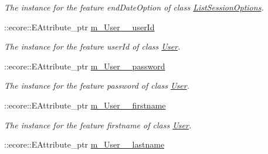 \begin{DoxyCompactItemize}
\begin{DoxyCompactList}\small\item\em The instance for the feature endDateOption of class \hyperlink{classUMS__Data_1_1ListSessionOptions}{ListSessionOptions}. \item\end{DoxyCompactList}\item 
\hypertarget{classUMS__Data_1_1UMS__DataPackage_a7c0066c7f09ef22aa501978b92c16e91}{
::ecore::EAttribute\_\-ptr \hyperlink{classUMS__Data_1_1UMS__DataPackage_a7c0066c7f09ef22aa501978b92c16e91}{m\_\-User\_\-\_\-userId}}
\label{classUMS__Data_1_1UMS__DataPackage_a7c0066c7f09ef22aa501978b92c16e91}

\begin{DoxyCompactList}\small\item\em The instance for the feature userId of class \hyperlink{classUMS__Data_1_1User}{User}. \item\end{DoxyCompactList}\item 
\hypertarget{classUMS__Data_1_1UMS__DataPackage_a287fa94327172154d4df2136a83a643d}{
::ecore::EAttribute\_\-ptr \hyperlink{classUMS__Data_1_1UMS__DataPackage_a287fa94327172154d4df2136a83a643d}{m\_\-User\_\-\_\-password}}
\label{classUMS__Data_1_1UMS__DataPackage_a287fa94327172154d4df2136a83a643d}

\begin{DoxyCompactList}\small\item\em The instance for the feature password of class \hyperlink{classUMS__Data_1_1User}{User}. \item\end{DoxyCompactList}\item 
\hypertarget{classUMS__Data_1_1UMS__DataPackage_ab089cedde07da25fa985259429779b55}{
::ecore::EAttribute\_\-ptr \hyperlink{classUMS__Data_1_1UMS__DataPackage_ab089cedde07da25fa985259429779b55}{m\_\-User\_\-\_\-firstname}}
\label{classUMS__Data_1_1UMS__DataPackage_ab089cedde07da25fa985259429779b55}

\begin{DoxyCompactList}\small\item\em The instance for the feature firstname of class \hyperlink{classUMS__Data_1_1User}{User}. \item\end{DoxyCompactList}\item 
\hypertarget{classUMS__Data_1_1UMS__DataPackage_a7f8590ff882e636a5d19ce6f3ee5d6fe}{
::ecore::EAttribute\_\-ptr \hyperlink{classUMS__Data_1_1UMS__DataPackage_a7f8590ff882e636a5d19ce6f3ee5d6fe}{m\_\-User\_\-\_\-lastname}}
\label{classUMS__Data_1_1UMS__DataPackage_a7f8590ff882e636a5d19ce6f3ee5d6fe}


\end{DoxyCompactItemize}
